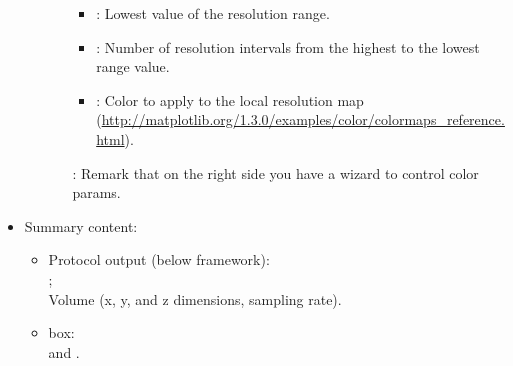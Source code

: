 \begin{itemize}
\begin{itemize}
\begin{itemize}
\begin{itemize}
            \item {}: Lowest value of the resolution range.
            \item {}: Number of resolution intervals from the highest to the lowest range value.
            \item {}: Color to apply to the local resolution map (\url{http://matplotlib.org/1.3.0/examples/color/colormaps_reference.html}).
        \end{itemize}  
        : Remark that on the right side you have a wizard to control color params.
     \end{itemize}
   \end{itemize} 


 \item Summary content:
  \begin{itemize}
     \item Protocol output (below \scipion framework):\\ ;\\ Volume (x, y, and z dimensions, sampling rate).
     \item {} box:\\  and .
    \end{itemize}
    
\end{itemize}
